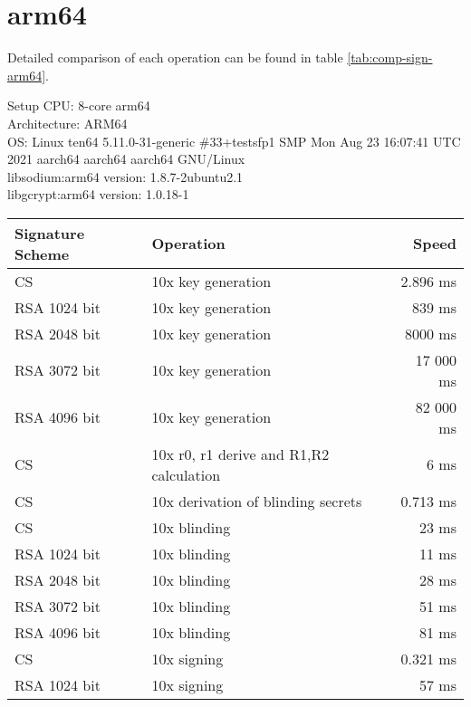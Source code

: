 \section{arm64}
Detailed comparison of each operation can be found in table \ref{tab:comp-sign-arm64}.
\begin{bfhBox}{Setup}
	CPU:  8-core arm64\\
    Architecture: ARM64 \\
    OS: Linux ten64 5.11.0-31-generic \#33+testsfp1 SMP Mon Aug 23 16:07:41 UTC 2021 aarch64 aarch64 aarch64 GNU/Linux \\
    libsodium:arm64 version: 1.8.7-2ubuntu2.1  \\ 
    libgcrypt:arm64 version: 1.0.18-1
\end{bfhBox}

\begin{table}[ht]
    \centering
    \setupBfhTabular
    \begin{tabular}{llr}
        \rowcolor{BFH-tablehead}
        \textbf{Signature Scheme} & \textbf{Operation} & \textbf{Speed} \\\hline
        CS & 10x key generation & 2.896 ms \\\hline
        RSA 1024 bit & 10x key generation & 839 ms \\\hline
        RSA 2048 bit & 10x key generation & 8000 ms \\\hline
        RSA 3072 bit & 10x key generation & 17 000 ms \\\hline
        RSA 4096 bit & 10x key generation & 82 000 ms \\\hline
        \hline
        CS & 10x r0, r1 derive and R1,R2 calculation & 6 ms \\\hline
        CS & 10x derivation of blinding secrets & 0.713 ms \\\hline
        CS & 10x blinding & 23 ms \\\hline
        RSA 1024 bit & 10x blinding & 11 ms \\\hline
        RSA 2048 bit & 10x blinding & 28 ms \\\hline
        RSA 3072 bit & 10x blinding & 51 ms \\\hline
        RSA 4096 bit & 10x blinding & 81 ms \\\hline
        \hline
        CS & 10x signing & 0.321 ms \\\hline
        RSA 1024 bit & 10x signing &  57 ms \\\hline

\end{tabular}
\end{table}
